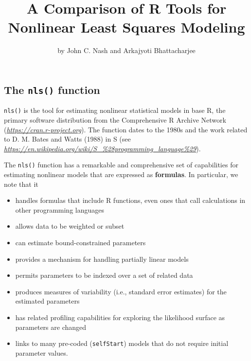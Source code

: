 \title{A Comparison of R Tools for Nonlinear Least Squares Modeling}
\author{by John C. Nash and Arkajyoti Bhattacharjee}

\maketitle


\subsection{\texorpdfstring{The \texttt{nls()} function}{The nls() function}}\label{the-nls-function}

\texttt{nls()} is the tool for estimating nonlinear statistical models in base R, the
primary software distribution
from the Comprehensive R Archive Network (\emph{\url{https://cran.r-project.org}}).
The function dates to the 1980s and the work related to D. M. Bates and Watts (1988) in S (see
\emph{\url{https://en.wikipedia.org/wiki/S_\%28programming_language\%29}}).

The \texttt{nls()} function has a remarkable and comprehensive set of capabilities for
estimating nonlinear models that are expressed as \textbf{formulas}. In particular, we
note that it

\begin{itemize}
\tightlist
\item
  handles formulas that include R functions, even ones that call calculations in
  other programming languages
\item
  allows data to be weighted or subset
\item
  can estimate bound-constrained parameters
\item
  provides a mechanism for handling partially linear models
\item
  permits parameters to be indexed over a set of related data
\item
  produces measures of variability (i.e., standard error estimates) for the
  estimated parameters
\item
  has related profiling capabilities for exploring the likelihood surface as
  parameters are changed
\item
  links to many pre-coded (\texttt{selfStart}) models that do not require
  initial parameter values.
\end{itemize}

